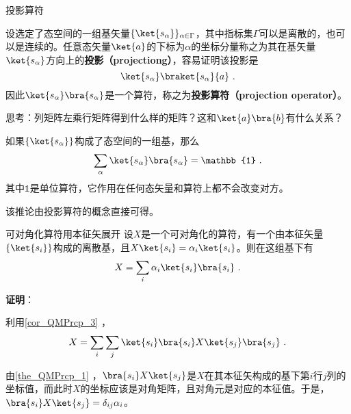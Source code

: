 \begin{example}{投影算符}

设选定了态空间的一组基矢量$\{\ket{s_\alpha}\}_{\alpha\in \Gamma}$，其中指标集$\Gamma$可以是离散的，也可以是连续的。任意态矢量$\ket{a}$的下标为$\alpha$的坐标分量称之为其在基矢量$\ket{s_\alpha}$方向上的\textbf{投影（projectiong）}，容易证明该投影是
\begin{equation}
\ket{s_\alpha}\braket{s_\alpha}{a}~.
\end{equation}
因此$\ket{s_\alpha}\bra{s_\alpha}$是一个算符，称之为\textbf{投影算符（projection operator）}。

思考：列矩阵左乘行矩阵得到什么样的矩阵？这和$\ket{a}\bra{b}$有什么关系？

\end{example}


\begin{corollary}{}\label{cor_QMPrcp_3}
如果$\{\ket{s_\alpha}\}$构成了态空间的一组基，那么
\begin{equation}
\sum_\alpha \ket{s_\alpha}\bra{s_\alpha} = \mathbb{1}~.
\end{equation}
其中$\mathbb{1}$是单位算符，它作用在任何态矢量和算符上都不会改变对方。
\end{corollary}

该推论由投影算符的概念直接可得。






\begin{corollary}{可对角化算符用本征矢展开}\label{cor_QMPrcp_2}
设$X$是一个可对角化的算符，有一个由本征矢量$\{\ket{s_i}\}$构成的离散基，且$X\ket{s_i}=\alpha_i\ket{s_i}$。则在这组基下有
\begin{equation}
X=\sum_{i}\alpha_i\ket{s_i}\bra{s_i}~.
\end{equation}
\end{corollary}

\textbf{证明}：


利用\autoref{cor_QMPrcp_3} ，
\begin{equation}\label{eq_QMPrcp_4}
X=\sum_{i}\sum_{j}\ket{s_i}\bra{s_i}X\ket{s_j}\bra{s_j}~.
\end{equation}

由\autoref{the_QMPrcp_1} ，$\bra{s_i}X\ket{s_j}$是$X$在其本征矢构成的基下第$i$行$j$列的坐标值，而此时$X$的坐标应该是对角矩阵，且对角元是对应的本征值。于是，$\bra{s_i}X\ket{s_j}=\delta_{ij}\alpha_i$。

